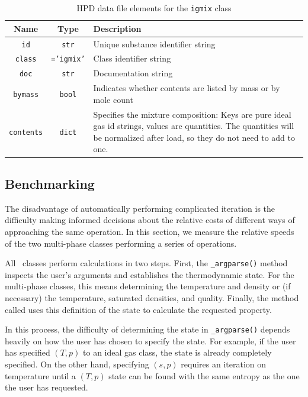 \begin{table}
\centering
\caption{HPD data file elements for the \texttt{igmix} class}\label{tab:class:igmix}
\begin{tabular}{|ccp{2.5in}|}
\hline
Name & Type & Description\\
\hline
\texttt{id} & \texttt{str} & Unique substance identifier string\\
\texttt{class} & \texttt{='igmix'} & Class identifier string\\
\texttt{doc} & \texttt{str} & Documentation string\\
\hline
\texttt{bymass} & \texttt{bool} & Indicates whether contents are listed by mass or by mole count\\
\texttt{contents} & \texttt{dict} & Specifies the mixture composition: Keys are pure ideal gas id strings, values are quantities.  The quantities will be normalized after load, so they do not need to add to one.\\
\hline
\end{tabular}
\end{table}

\subsection{Benchmarking}

The disadvantage of automatically performing complicated iteration is the difficulty making informed decisions about the relative costs of different ways of approaching the same operation.  In this section, we measure the relative speeds of the two multi-phase classes performing a series of operations.  

All \PM\ classes perform calculations in two steps.  First, the \verb|_argparse()| method inspects the user's arguments and establishes the thermodynamic state.  For the multi-phase classes, this means determining the temperature and density or (if necessary) the temperature, saturated densities, and quality.  Finally, the method called uses this definition of the state to calculate the requested property.  

In this process, the difficulty of determining the state in \verb|_argparse()| depends heavily on how the user has chosen to specify the state.  For example, if the user has specified $(T,p)$ to an ideal gas class, the state is already completely specified.  On the other hand, specifying $(s,p)$ requires an iteration on temperature until a $(T,p)$ state can be found with the same entropy as the one the user has requested.  

